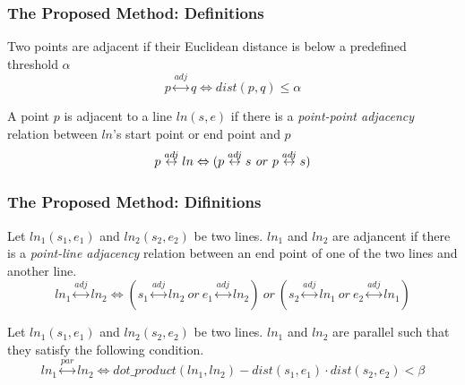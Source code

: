 \begin{frame}
\frametitle{The Proposed Method: Definitions}

\begin{definition}
  Two points are adjacent if their Euclidean distance is below a predefined threshold $\alpha$
  \begin{equation}
    p \overset{adj}{\leftrightarrow} q \Leftrightarrow dist(p,q) \leq \alpha
  \end{equation}
\end{definition}

\begin{definition}
  A point $p$ is adjacent to a line $ln(s,e)$ if there is a \emph{point-point adjacency} relation between $ln$'s start point or end point and $p$
  \begin{equation}
    p \overset{adj}{\leftrightarrow} ln \Leftrightarrow (p \overset{adj}{\leftrightarrow} s \textbf ~or~ p \overset{adj}{\leftrightarrow} s)
  \end{equation}
\end{definition}

\end{frame}


\begin{frame}
\frametitle{The Proposed Method: Difinitions}

\begin{definition}
  Let $ln_1(s_1, e_1)$ and $ln_2(s_2, e_2)$ be two lines. $ln_1$ and $ln_2$ are adjancent if there is a \emph{point-line adjacency} relation between an end point of one of the two lines and another line.
  \begin{equation}
    ln_1 \overset{adj}{\leftrightarrow} ln_2 \Leftrightarrow (s_1 \overset{adj}{\leftrightarrow} ln_2 ~or~e_1 \overset{adj}{\leftrightarrow} ln_2) ~or~ (s_2 \overset{adj}{\leftrightarrow} ln_1 ~or~e_2 \overset{adj}{\leftrightarrow} ln_1)
  \end{equation}
\end{definition}

\begin{definition}
  Let $ln_1(s_1, e_1)$ and $ln_2(s_2, e_2)$ be two lines. $ln_1$ and $ln_2$ are parallel such that they satisfy the following condition.
  \begin{equation}
    ln_1 \overset{par}{\leftrightarrow} ln_2 \Leftrightarrow dot\_product(ln_1, ln_2) - dist(s_1, e_1) \cdot dist(s_2,e_2) < \beta
  \end{equation}
\end{definition}

\end{frame}

